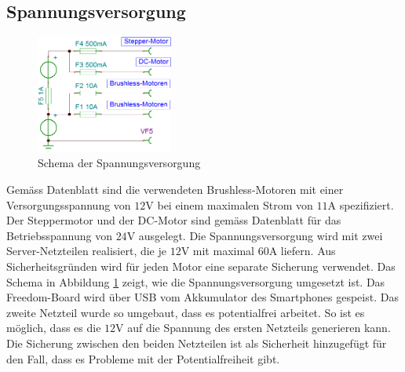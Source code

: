     \subsection{Spannungsversorgung}       
        \begin{figure}
           	\includegraphics[width=0.40\textwidth,clip,trim=0mm 0.5mm 0mm 0mm]
           	{Enddokumentation/Bilder/BeschaltungNetzteile.png}
           	\centering
           	\caption{Schema der Spannungsversorgung} 
           	\label{abb:Spannungsversorgung}
        \end{figure}
        Gemäss Datenblatt sind die verwendeten Brushless-Motoren mit einer Versorgungsspannung 
        von $12\si{\volt}$ bei einem maximalen Strom von $11\si{\ampere}$ spezifiziert. 
        Der Steppermotor und der DC-Motor sind gemäss Datenblatt für das Betriebsspannung  
        von $24\si{\volt}$ ausgelegt. Die Spannungsversorgung wird mit zwei Server-Netzteilen 
        realisiert, die je $12\si{\volt}$ mit maximal $60\si{\ampere}$ liefern. Aus 
        Sicherheitsgründen wird für jeden Motor eine separate Sicherung verwendet. Das Schema 
        in Abbildung \ref{abb:Spannungsversorgung} zeigt, wie die Spannungsversorgung 
        umgesetzt ist. Das Freedom-Board wird über USB vom Akkumulator des Smartphones 
        gespeist. Das zweite Netzteil wurde so umgebaut, dass es potentialfrei arbeitet. So 
        ist es möglich, dass es die $12\si{\volt}$ auf die Spannung des ersten Netzteils 
        generieren kann. Die Sicherung zwischen den beiden Netzteilen ist als Sicherheit 
        hinzugefügt für den Fall, dass es Probleme mit der Potentialfreiheit gibt.
